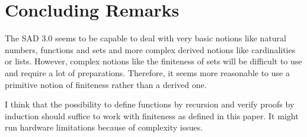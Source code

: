 \documentclass[10pt]{article}
\theoremstyle{definition}
\theoremstyle{plain}
\theoremstyle{remark}
\begin{document}
\section{Concluding Remarks} The SAD 3.0 seems to be capable to deal with very basic notions like natural numbers, functions and sets and more complex derived notions like cardinalities or lists. However, complex notions like the finiteness of sets will be difficult to use and require a lot of preparations. Therefore, it seems more reasonable to use a primitive notion of finiteness rather than a derived one. 

I think that the possibility to define functions by recursion and verify proofs by induction should suffice to work with finiteness as defined in this paper. It might run hardware limitations because of complexity issues.
\end{document}
